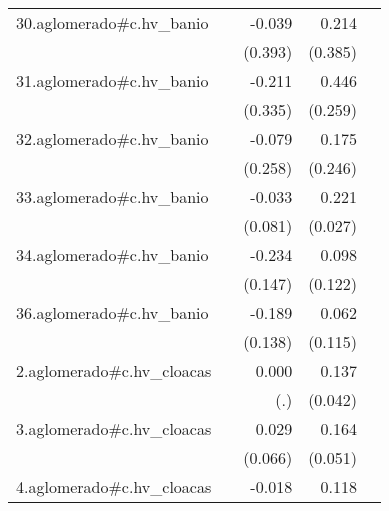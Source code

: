 {\begin{longtable}{l*{4}{D{.}{.}{-1}}}
\addlinespace
30.aglomerado#c.hv\_banio&                     &      -0.039         &       0.214         &                     \\
            &                     &     (0.393)         &     (0.385)         &                     \\
\addlinespace
31.aglomerado#c.hv\_banio&                     &      -0.211         &       0.446         &                     \\
            &                     &     (0.335)         &     (0.259)         &                     \\
\addlinespace
32.aglomerado#c.hv\_banio&                     &      -0.079         &       0.175         &                     \\
            &                     &     (0.258)         &     (0.246)         &                     \\
\addlinespace
33.aglomerado#c.hv\_banio&                     &      -0.033         &       0.221\sym{***}&                     \\
            &                     &     (0.081)         &     (0.027)         &                     \\
\addlinespace
34.aglomerado#c.hv\_banio&                     &      -0.234         &       0.098         &                     \\
            &                     &     (0.147)         &     (0.122)         &                     \\
\addlinespace
36.aglomerado#c.hv\_banio&                     &      -0.189         &       0.062         &                     \\
            &                     &     (0.138)         &     (0.115)         &                     \\
\addlinespace
2.aglomerado#c.hv\_cloacas&                     &       0.000         &       0.137\sym{**} &                     \\
            &                     &         (.)         &     (0.042)         &                     \\
\addlinespace
3.aglomerado#c.hv\_cloacas&                     &       0.029         &       0.164\sym{**} &                     \\
            &                     &     (0.066)         &     (0.051)         &                     \\
\addlinespace
4.aglomerado#c.hv\_cloacas&                     &      -0.018         &       0.118\sym{***}&                     \\

\end{longtable}}
